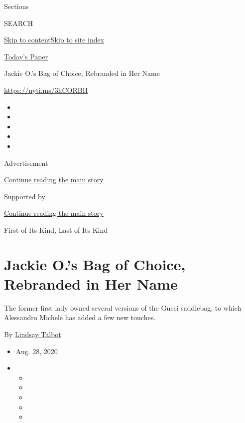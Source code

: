 Sections

SEARCH

\protect\hyperlink{site-content}{Skip to
content}\protect\hyperlink{site-index}{Skip to site index}

\href{https://myaccount.nytimes3xbfgragh.onion/auth/login?response_type=cookie\&client_id=vi}{}

\href{https://www.nytimes3xbfgragh.onion/section/todayspaper}{Today's
Paper}

Jackie O.'s Bag of Choice, Rebranded in Her Name

\url{https://nyti.ms/3hCORBH}

\begin{itemize}
\item
\item
\item
\item
\item
\end{itemize}

Advertisement

\protect\hyperlink{after-top}{Continue reading the main story}

Supported by

\protect\hyperlink{after-sponsor}{Continue reading the main story}

First of Its Kind, Last of Its Kind

\hypertarget{jackie-os-bag-of-choice-rebranded-in-her-name}{%
\section{Jackie O.'s Bag of Choice, Rebranded in Her
Name}\label{jackie-os-bag-of-choice-rebranded-in-her-name}}

The former first lady owned several versions of the Gucci saddlebag, to
which Alessandro Michele has added a few new touches.

By \href{https://www.nytimes3xbfgragh.onion/by/lindsay-talbot}{Lindsay
Talbot}

\begin{itemize}
\item
  Aug. 28, 2020
\item
  \begin{itemize}
  \item
  \item
  \item
  \item
  \item
  \end{itemize}
\end{itemize}

